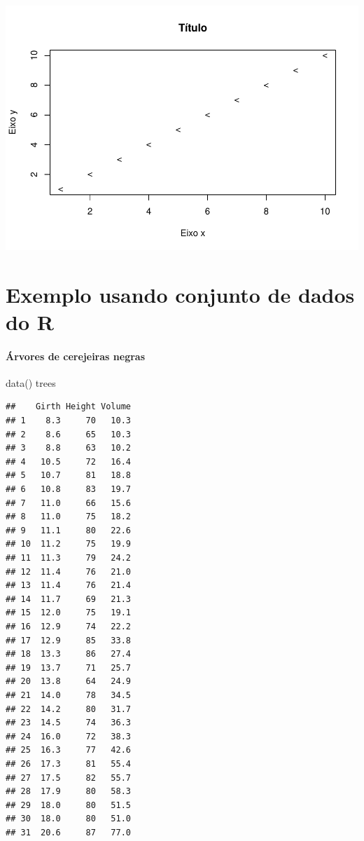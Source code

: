 \documentclass[
]{article}
\newenvironment{Shaded}{\begin{snugshade}}{\end{snugshade}}
\newcommand{\FunctionTok}[1]{\textcolor[rgb]{0.00,0.00,0.00}{#1}}
\newcommand{\NormalTok}[1]{#1}
\begin{document}
\includegraphics{presencial_função_plot_04_turma_B_files/figure-latex/unnamed-chunk-12-3.pdf}

\hypertarget{exemplo-usando-conjunto-de-dados-do-r}{%
\section{Exemplo usando conjunto de dados do
R}\label{exemplo-usando-conjunto-de-dados-do-r}}

\hypertarget{uxe1rvores-de-cerejeiras-negras}{%
\paragraph{Árvores de cerejeiras
negras}\label{uxe1rvores-de-cerejeiras-negras}}

\begin{Shaded}
\begin{Highlighting}[]
\FunctionTok{data}\NormalTok{()}
\NormalTok{trees}
\end{Highlighting}
\end{Shaded}

\begin{verbatim}
##    Girth Height Volume
## 1    8.3     70   10.3
## 2    8.6     65   10.3
## 3    8.8     63   10.2
## 4   10.5     72   16.4
## 5   10.7     81   18.8
## 6   10.8     83   19.7
## 7   11.0     66   15.6
## 8   11.0     75   18.2
## 9   11.1     80   22.6
## 10  11.2     75   19.9
## 11  11.3     79   24.2
## 12  11.4     76   21.0
## 13  11.4     76   21.4
## 14  11.7     69   21.3
## 15  12.0     75   19.1
## 16  12.9     74   22.2
## 17  12.9     85   33.8
## 18  13.3     86   27.4
## 19  13.7     71   25.7
## 20  13.8     64   24.9
## 21  14.0     78   34.5
## 22  14.2     80   31.7
## 23  14.5     74   36.3
## 24  16.0     72   38.3
## 25  16.3     77   42.6
## 26  17.3     81   55.4
## 27  17.5     82   55.7
## 28  17.9     80   58.3
## 29  18.0     80   51.5
## 30  18.0     80   51.0
## 31  20.6     87   77.0
\end{verbatim}
\end{document}
